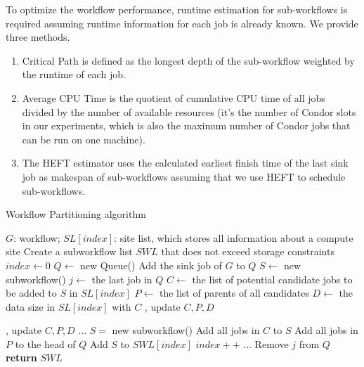 To optimize the workflow performance, runtime estimation for sub-workflows is required assuming runtime information for each job is already known. We provide three methods. 
\begin{enumerate}
\item Critical Path is defined as the longest depth of the sub-workflow weighted by the runtime of each job. 
\item Average CPU Time is the quotient of cumulative CPU time of all jobs divided by the number of available resources (it’s the number of Condor slots in our experiments, which is also the maximum number of Condor jobs that can be run on one machine). 
\item The HEFT estimator uses the calculated earliest finish time of the last sink job as makespan of sub-workflows assuming that we use HEFT to schedule sub-workflows. 
\end{enumerate}

\begin{algorithm}[h!]
\caption{Workflow Partitioning algorithm}
\label{alg:parworkflow}
\begin{algorithmic}[1]
\Require $G$: workflow; $SL[index]$: site list, which stores all information about a compute site
\Ensure Create a subworkflow list $SWL$ that does not exceed storage constraints
   \State $index\gets 0$
   \State $Q\gets$ new Queue()
   \State Add the sink job of $G$ to $Q$
   \State $S\gets$ new subworkflow()
      \State $j\gets$ the last job in $Q$
      \State {} 
      \State $C\gets$ the list of potential candidate jobs to be added to $S$ in $SL[index]$
      \State $P\gets$ the list of parents of all candidates
      \State $D\gets$ the data size in $SL[index]$ with $C$
         \State {}, update $C,P,D$
      
         \State {}, update $C,P,D$
      \EndIf
      \EndIf
	\State ...
         \State$S=$ new subworkflow()
      \EndIf
     \State Add all jobs in $C$ to $S$
     \State Add all jobs in $P$ to the head of $Q$
     \State Add $S$ to $SWL[index]$
         \State $index++$
      \EndIf
   \State ... 
   \State Remove $j$ from $Q$
   \EndWhile
   \State \textbf{return }$SWL$

\EndProcedure
\end{algorithmic}
\end{algorithm}


